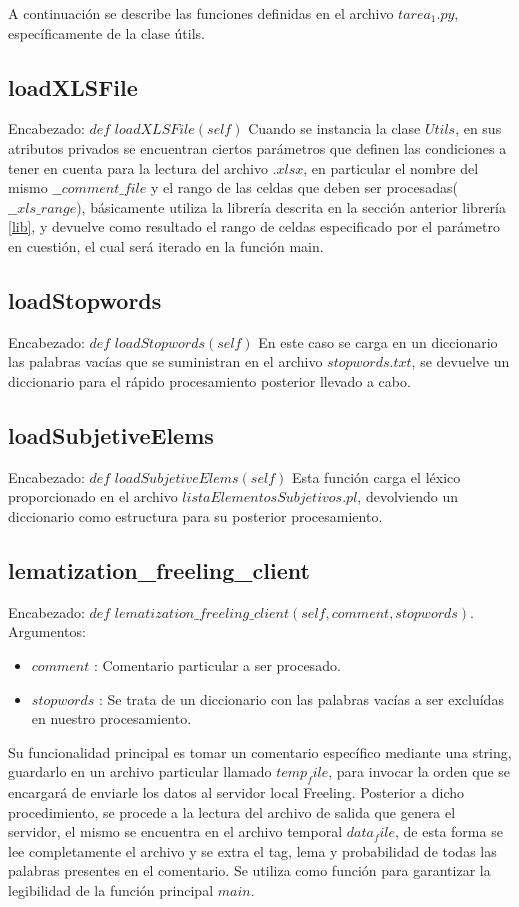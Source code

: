 \documentclass[12pt]{article}
\begin{document}
A continuación se describe las funciones definidas en el archivo $tarea_1.py$, específicamente de la clase útils.


\subsection{loadXLSFile} \label{xlslib}
Encabezado: $def$ $loadXLSFile(self)$
Cuando se instancia la clase $Utils$, en sus atributos privados se encuentran ciertos parámetros que definen las condiciones a tener en cuenta para la lectura del archivo $.xlsx$, en particular el nombre del mismo $\_\_comment\_file$ y el rango de las celdas que deben ser procesadas($\_\_xls\_range$), básicamente utiliza la librería descrita en la sección anterior librería \ref{lib}, y devuelve como resultado el rango de celdas especificado por el parámetro en cuestión, el cual será iterado en la función main.


\subsection{loadStopwords}
Encabezado: $def$ $loadStopwords(self)$
En este caso se carga en un diccionario las palabras vacías que se suministran en el archivo $stopwords.txt$, se devuelve un diccionario para el rápido procesamiento posterior llevado a cabo.


\subsection{loadSubjetiveElems}
Encabezado: $def$ $loadSubjetiveElems(self)$
Esta función carga el léxico proporcionado en el archivo $listaElementosSubjetivos.pl$, devolviendo un diccionario como estructura para su posterior procesamiento.


\subsection{lematization\_freeling\_client}
Encabezado: $def$ $lematization\_freeling\_client(self, comment, stopwords)$.
Argumentos:
\begin{itemize}
  \item $comment$ : Comentario particular a ser procesado.
  \item $stopwords$ : Se trata de un diccionario con las palabras vacías a ser excluídas en nuestro procesamiento.
\end{itemize}
Su funcionalidad principal es tomar un comentario específico mediante una string, guardarlo en un archivo particular llamado $temp_file$, para invocar la orden que se encargará de enviarle los datos al servidor local Freeling. Posterior a dicho procedimiento, se procede a la lectura del archivo de salida que genera el servidor, el mismo se encuentra en el archivo temporal $data_file$, de esta forma se lee completamente el archivo y se extra el tag, lema y probabilidad de todas las palabras presentes en el comentario.
Se utiliza como función para garantizar la legibilidad de la función principal $main$.
\end{document}
